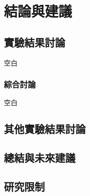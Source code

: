 \chapter{結論與建議}
\label{c:conclusion}
\section{實驗結果討論}

空白

\subsection{綜合討論}

空白


\section{其他實驗結果討論}





\section{總結與未來建議}

\section{研究限制}
